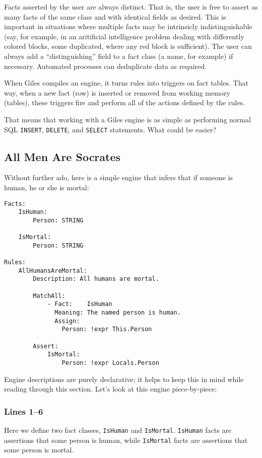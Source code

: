 \documentclass[letterpaper,10pt]{article}
\begin{document}
Facts asserted by the user are always distinct.
That is, the user is free to assert as many facts of the same class and with identical fields as desired.
This is important in situations where multiple facts may be intrinsicly indistinguishable (say, for example, in an aritificial intelligence problem dealing with differently colored blocks, some duplicated, where any red block is sufficient).
The user can always add a ``distinguishing'' field to a fact class (a name, for example) if necessary.
Automated processes can deduplicate data as required.

When Giles compiles an engine, it turns rules into triggers on fact tables.
That way, when a new fact (row) is inserted or removed from working memory (tables), these triggers fire and perform all of the actions defined by the rules.

That means that working with a Giles engine is as simple as performing normal SQL \texttt{INSERT}, \texttt{DELETE}, and \texttt{SELECT} statements.
What could be easier?

\subsection{All Men Are Socrates}
Without further ado, here is a simple engine that infers that if someone is human, he or she is mortal:
\begin{lstlisting}
Facts:
    IsHuman:
        Person: STRING

    IsMortal:
        Person: STRING

Rules:
    AllHumansAreMortal:
        Description: All humans are mortal.

        MatchAll:
            - Fact:    IsHuman
              Meaning: The named person is human.
              Assign:
                Person: !expr This.Person

        Assert:
            IsMortal:
                Person: !expr Locals.Person
\end{lstlisting}

Engine descriptions are purely declarative; it helps to keep this in mind while reading through this section.
Let's look at this engine piece-by-piece:

\subsubsection*{Lines 1--6}
Here we define two fact classes, \texttt{IsHuman} and \texttt{IsMortal}.
\texttt{IsHuman} facts are assertions that some person is human, while \texttt{IsMortal} facts are assertions that some person is mortal.
\end{document}
